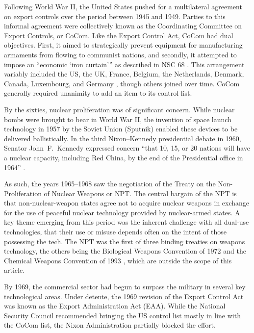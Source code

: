 \documentclass[12pt]{olfmemo}
\begin{document}
Following World War II, the United States pushed for a multilateral agreement on export controls over the period between 1945 and 1949. Parties to this informal agreement were collectively known as the Coordinating Committee on Export Controls, or CoCom. Like the Export Control Act, CoCom had dual objectives. First, it aimed to strategically prevent equipment for manufacturing armaments from flowing to communist nations, and secondly, it attempted to impose an ``economic `iron curtain''' as described in NSC 68 \citep{NSC68}. This arrangement variably included the US, the UK, France, Belgium, the Netherlands, Denmark, Canada, Luxembourg, and Germany \citep{Yasuhara1991}, though others joined over time. CoCom generally required unanimity to add an item to its control list.

By the sixties, nuclear proliferation was of significant concern. While nuclear bombs were brought to bear in World War II, the invention of space launch technology in 1957 by the Soviet Union (Sputnik) enabled these devices to be delivered ballistically. In the third Nixon--Kennedy presidential debate in 1960, Senator John~F.~Kennedy expressed concern ``that 10, 15, or 20 nations will have a nuclear capacity, including Red China, by the end of the Presidential office in 1964'' \citep{NixonKennedy3rd1960}.

As such, the years 1965--1968 saw the negotiation of the Treaty on the Non-Proliferation of Nuclear Weapons or NPT. The central bargain of the NPT is that non-nuclear-weapon states agree not to acquire nuclear weapons in exchange for the use of peaceful nuclear technology provided by nuclear-armed states. A key theme emerging from this period was the inherent challenge with all dual-use technologies, that their use or misuse depends often on the intent of those possessing the tech. The NPT was the first of three binding treaties on weapons technology, the others being the Biological Weapons Convention of 1972 and the Chemical Weapons Convention of 1993 \citep{Beck2019}, which are outside the scope of this article.

By 1969, the commercial sector had begun to surpass the military in several key technological areas. Under detente, the 1969 revision of the Export Control Act was known as the Export Administration Act (EAA). While the National Security Council recommended bringing the US control list mostly in line with the CoCom list, the Nixon Administration partially blocked the effort. \citep{NAP1987}
\end{document}
